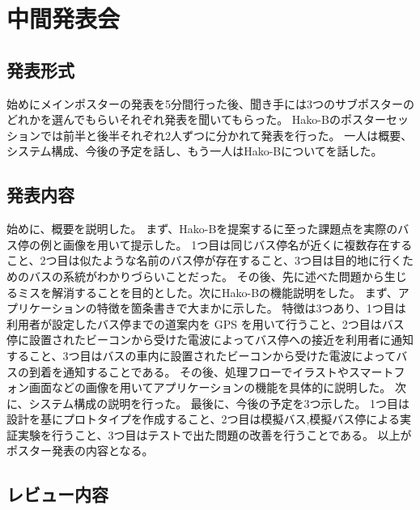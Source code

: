 \documentclass[openany,11pt,papersize]{jsbook}
\begin{document}

\section{中間発表会}
\subsection{発表形式}
始めにメインポスターの発表を5分間行った後、聞き手には3つのサブポスターのどれかを選んでもらいそれぞれ発表を聞いてもらった。
Hako-Bのポスターセッションでは前半と後半それぞれ2人ずつに分かれて発表を行った。
一人は概要、システム構成、今後の予定を話し、もう一人はHako-Bについてを話した。


\subsection{発表内容}
始めに、概要を説明した。
まず、Hako-Bを提案するに至った課題点を実際のバス停の例と画像を用いて提示した。
1つ目は同じバス停名が近くに複数存在すること、2つ目は似たような名前のバス停が存在すること、3つ目は目的地に行くためのバスの系統がわかりづらいことだった。
その後、先に述べた問題から生じるミスを解消することを目的とした。次にHako-Bの機能説明をした。
まず、アプリケーションの特徴を箇条書きで大まかに示した。
特徴は3つあり、1つ目は利用者が設定したバス停までの道案内を GPS を用いて行うこと、2つ目はバス停に設置されたビーコンから受けた電波によってバス停への接近を利用者に通知すること、3つ目はバスの車内に設置されたビーコンから受けた電波によってバスの到着を通知することである。
その後、処理フローでイラストやスマートフォン画面などの画像を用いてアプリケーションの機能を具体的に説明した。
次に、システム構成の説明を行った。
最後に、今後の予定を3つ示した。
1つ目は設計を基にプロトタイプを作成すること、2つ目は模擬バス,模擬バス停による実証実験を行うこと、3つ目はテストで出た問題の改善を行うことである。
以上がポスター発表の内容となる。


\subsection{レビュー内容}
\end{document}
